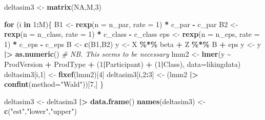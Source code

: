 \documentclass[
]{article}
\newenvironment{Shaded}{\begin{snugshade}}{\end{snugshade}}
\newcommand{\AttributeTok}[1]{\textcolor[rgb]{0.13,0.29,0.53}{#1}}
\newcommand{\CommentTok}[1]{\textcolor[rgb]{0.56,0.35,0.01}{\textit{#1}}}
\newcommand{\ConstantTok}[1]{\textcolor[rgb]{0.56,0.35,0.01}{#1}}
\newcommand{\ControlFlowTok}[1]{\textcolor[rgb]{0.13,0.29,0.53}{\textbf{#1}}}
\newcommand{\DecValTok}[1]{\textcolor[rgb]{0.00,0.00,0.81}{#1}}
\newcommand{\FunctionTok}[1]{\textcolor[rgb]{0.13,0.29,0.53}{\textbf{#1}}}
\newcommand{\NormalTok}[1]{#1}
\newcommand{\OtherTok}[1]{\textcolor[rgb]{0.56,0.35,0.01}{#1}}
\newcommand{\SpecialCharTok}[1]{\textcolor[rgb]{0.81,0.36,0.00}{\textbf{#1}}}
\newcommand{\StringTok}[1]{\textcolor[rgb]{0.31,0.60,0.02}{#1}}
\begin{document}
\begin{Shaded}
\begin{Highlighting}[]
\NormalTok{deltasim3 }\OtherTok{\textless{}{-}} \FunctionTok{matrix}\NormalTok{(}\ConstantTok{NA}\NormalTok{,M,}\DecValTok{3}\NormalTok{)}

\ControlFlowTok{for}\NormalTok{ (i }\ControlFlowTok{in} \DecValTok{1}\SpecialCharTok{:}\NormalTok{M)\{}
\NormalTok{  B1 }\OtherTok{\textless{}{-}} \FunctionTok{rexp}\NormalTok{(}\AttributeTok{n =}\NormalTok{ n\_par, }\AttributeTok{rate =} \DecValTok{1}\NormalTok{) }\SpecialCharTok{*}\NormalTok{ c\_par }\SpecialCharTok{{-}}\NormalTok{ c\_par}
\NormalTok{  B2 }\OtherTok{\textless{}{-}} \FunctionTok{rexp}\NormalTok{(}\AttributeTok{n =}\NormalTok{ n\_class, }\AttributeTok{rate =} \DecValTok{1}\NormalTok{) }\SpecialCharTok{*}\NormalTok{ c\_class }\SpecialCharTok{{-}}\NormalTok{  c\_class}
\NormalTok{  eps }\OtherTok{\textless{}{-}} \FunctionTok{rexp}\NormalTok{(}\AttributeTok{n =}\NormalTok{ n\_eps, }\AttributeTok{rate =} \DecValTok{1}\NormalTok{) }\SpecialCharTok{*}\NormalTok{ c\_eps }\SpecialCharTok{{-}}\NormalTok{ c\_eps}
\NormalTok{  B }\OtherTok{\textless{}{-}} \FunctionTok{c}\NormalTok{(B1,B2)}
\NormalTok{  y }\OtherTok{\textless{}{-}}\NormalTok{ X }\SpecialCharTok{\%*\%}\NormalTok{ beta }\SpecialCharTok{+}\NormalTok{ Z }\SpecialCharTok{\%*\%}\NormalTok{ B }\SpecialCharTok{+}\NormalTok{ eps}
\NormalTok{  y }\OtherTok{\textless{}{-}}\NormalTok{ y }\SpecialCharTok{|\textgreater{}} \FunctionTok{as.numeric}\NormalTok{() }\CommentTok{\# NB. This seems to be necessary}
\NormalTok{  lmm2 }\OtherTok{\textless{}{-}} \FunctionTok{lmer}\NormalTok{(y }\SpecialCharTok{\textasciitilde{}}\NormalTok{ ProdVersion }\SpecialCharTok{+}\NormalTok{ ProdType }\SpecialCharTok{+}\NormalTok{ (}\DecValTok{1}\SpecialCharTok{|}\NormalTok{Participant) }\SpecialCharTok{+}\NormalTok{ (}\DecValTok{1}\SpecialCharTok{|}\NormalTok{Class), }\AttributeTok{data=}\NormalTok{likingdata)}
\NormalTok{  deltasim3[i,}\DecValTok{1}\NormalTok{] }\OtherTok{\textless{}{-}} \FunctionTok{fixef}\NormalTok{(lmm2)[}\DecValTok{4}\NormalTok{]}
\NormalTok{  deltasim3[i,}\DecValTok{2}\SpecialCharTok{:}\DecValTok{3}\NormalTok{] }\OtherTok{\textless{}{-}}\NormalTok{ (lmm2 }\SpecialCharTok{|\textgreater{}} \FunctionTok{confint}\NormalTok{(}\AttributeTok{method=}\StringTok{"Wald"}\NormalTok{))[}\DecValTok{7}\NormalTok{,]}
\NormalTok{\}}

\NormalTok{deltasim3 }\OtherTok{\textless{}{-}}\NormalTok{ deltasim3 }\SpecialCharTok{|\textgreater{}} \FunctionTok{data.frame}\NormalTok{()}
\FunctionTok{names}\NormalTok{(deltasim3) }\OtherTok{\textless{}{-}} \FunctionTok{c}\NormalTok{(}\StringTok{"est"}\NormalTok{,}\StringTok{"lower"}\NormalTok{,}\StringTok{"upper"}\NormalTok{)}
\end{Highlighting}
\end{Shaded}
\end{document}
